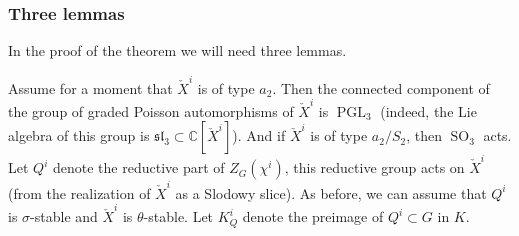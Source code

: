 \documentclass[12pt]{amsart}
\newcommand{\C}{\mathbb{C}}
\newcommand{\Z}{\mathbb{Z}}
\newtheorem{Cor}[Thm]{Corollary}
\theoremstyle{definition}
\numberwithin{equation}{section}
\begin{document}
%

\subsubsection{Three lemmas}
In the proof of the theorem we will need three lemmas.

Assume for a moment that $\check{X}^i$ is of type $a_2$. Then the connected component of the  group of graded Poisson automorphisms of $\check{X}^i$ is $\operatorname{PGL}_3$ (indeed, the Lie algebra of this group is $\mathfrak{sl}_3\subset \C[\check{X}^i]$).
And if $\check{X}^i$ is of type $a_2/S_2$, then $\operatorname{SO}_3$ acts. Let
$Q^i$ denote the reductive part of $Z_G(\chi^i)$, this reductive group acts on
$\check{X}^i$ (from the realization of $\check{X}^i$ as a Slodowy slice). As before, we can assume that $Q^i$ is $\sigma$-stable and $\check{X}^i$ is $\theta$-stable.
Let $K^i_Q$ denote the preimage of $Q^i\subset G$ in $K$.
\end{document}

